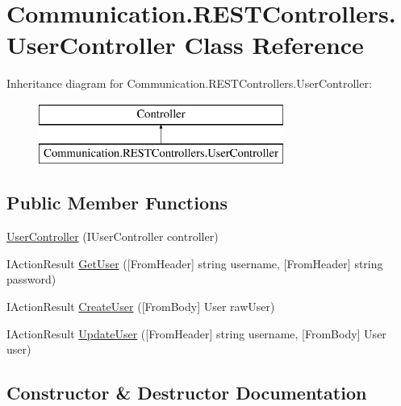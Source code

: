\hypertarget{class_communication_1_1_r_e_s_t_controllers_1_1_user_controller}{}\section{Communication.\+R\+E\+S\+T\+Controllers.\+User\+Controller Class Reference}
\label{class_communication_1_1_r_e_s_t_controllers_1_1_user_controller}
Inheritance diagram for Communication.\+R\+E\+S\+T\+Controllers.\+User\+Controller\+:\begin{figure}[H]
\begin{center}
\leavevmode
\includegraphics[height=2.000000cm]{class_communication_1_1_r_e_s_t_controllers_1_1_user_controller}
\end{center}
\end{figure}
\subsection*{Public Member Functions}
\begin{DoxyCompactItemize}
\item 
\mbox{\hyperlink{class_communication_1_1_r_e_s_t_controllers_1_1_user_controller_a5a4d1736034eb42ed3f6935923b3185c}{User\+Controller}} (I\+User\+Controller controller)
\item 
I\+Action\+Result \mbox{\hyperlink{class_communication_1_1_r_e_s_t_controllers_1_1_user_controller_a8a737663a9c771648976dd701cb10958}{Get\+User}} (\mbox{[}From\+Header\mbox{]} string username, \mbox{[}From\+Header\mbox{]} string password)
\item 
I\+Action\+Result \mbox{\hyperlink{class_communication_1_1_r_e_s_t_controllers_1_1_user_controller_a34eb238433f582672fa80aea7e830822}{Create\+User}} (\mbox{[}From\+Body\mbox{]} User raw\+User)
\item 
I\+Action\+Result \mbox{\hyperlink{class_communication_1_1_r_e_s_t_controllers_1_1_user_controller_aa97f36ee98608527aed8be3ffe27476f}{Update\+User}} (\mbox{[}From\+Header\mbox{]} string username, \mbox{[}From\+Body\mbox{]} User user)
\end{DoxyCompactItemize}


\subsection{Constructor \& Destructor Documentation}
\mbox{\label{class_communication_1_1_r_e_s_t_controllers_1_1_user_controller_a5a4d1736034eb42ed3f6935923b3185c}} 
